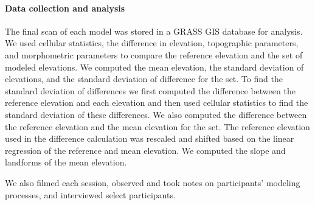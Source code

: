\documentclass[prodmode,acmtochi]{acmsmall} %
\begin{document}
\paragraph{Data collection and analysis}
The final scan of each model was stored in a GRASS GIS database for analysis. 
We used cellular statistics, the difference in elevation, 
topographic parameters, and morphometric parameters
to compare the reference elevation and the set of modeled elevations. 
We computed 
the mean elevation,
the standard deviation of elevations, 
and the standard deviation of difference for the set.
To find the standard deviation of differences 
we first computed the difference between the reference elevation and each elevation 
and then used cellular statistics to find the standard deviation of these differences.
We also computed the difference between the 
reference elevation and the mean elevation for the set. 
The reference elevation used in the difference calculation was rescaled and shifted based on the linear regression of the reference and mean elevation.
We computed the slope and landforms of the mean elevation. 

We also filmed each session, 
observed and took notes on participants' modeling processes, 
and interviewed select participants.
\end{document}
